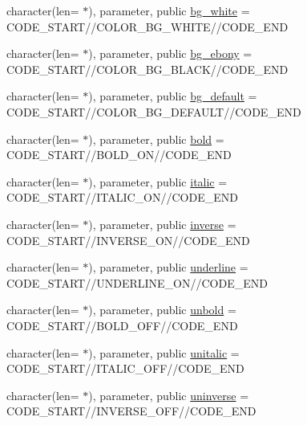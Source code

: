 \begin{DoxyCompactItemize}
\item 
character(len= $\ast$), parameter, public \mbox{\hyperlink{namespacem__escape_a87dfd88e3190a8717cc574d4f2a4445c}{bg\+\_\+white}} = C\+O\+D\+E\+\_\+\+S\+T\+A\+RT//C\+O\+L\+O\+R\+\_\+\+B\+G\+\_\+\+W\+H\+I\+TE//C\+O\+D\+E\+\_\+\+E\+ND
\item 
character(len= $\ast$), parameter, public \mbox{\hyperlink{namespacem__escape_ab3691cc02cfaf12d6f7e18fac8a70b0b}{bg\+\_\+ebony}} = C\+O\+D\+E\+\_\+\+S\+T\+A\+RT//C\+O\+L\+O\+R\+\_\+\+B\+G\+\_\+\+B\+L\+A\+CK//C\+O\+D\+E\+\_\+\+E\+ND
\item 
character(len= $\ast$), parameter, public \mbox{\hyperlink{namespacem__escape_a329b88dbfe4ad42f896cdf408dcd9784}{bg\+\_\+default}} = C\+O\+D\+E\+\_\+\+S\+T\+A\+RT//C\+O\+L\+O\+R\+\_\+\+B\+G\+\_\+\+D\+E\+F\+A\+U\+LT//C\+O\+D\+E\+\_\+\+E\+ND
\item 
character(len= $\ast$), parameter, public \mbox{\hyperlink{namespacem__escape_a9a369de1d051ce7fdbdedcba4574c962}{bold}} = C\+O\+D\+E\+\_\+\+S\+T\+A\+RT//B\+O\+L\+D\+\_\+\+ON//C\+O\+D\+E\+\_\+\+E\+ND
\item 
character(len= $\ast$), parameter, public \mbox{\hyperlink{namespacem__escape_afbb060c43fe019ca7fc699073cf30399}{italic}} = C\+O\+D\+E\+\_\+\+S\+T\+A\+RT//I\+T\+A\+L\+I\+C\+\_\+\+ON//C\+O\+D\+E\+\_\+\+E\+ND
\item 
character(len= $\ast$), parameter, public \mbox{\hyperlink{namespacem__escape_a568054a95202a9290fc4f314ff7c9012}{inverse}} = C\+O\+D\+E\+\_\+\+S\+T\+A\+RT//I\+N\+V\+E\+R\+S\+E\+\_\+\+ON//C\+O\+D\+E\+\_\+\+E\+ND
\item 
character(len= $\ast$), parameter, public \mbox{\hyperlink{namespacem__escape_acee3a3082a12ed884ef99019d0f30f86}{underline}} = C\+O\+D\+E\+\_\+\+S\+T\+A\+RT//U\+N\+D\+E\+R\+L\+I\+N\+E\+\_\+\+ON//C\+O\+D\+E\+\_\+\+E\+ND
\item 
character(len= $\ast$), parameter, public \mbox{\hyperlink{namespacem__escape_aaa2404c29a0f5840417e71a8219a118c}{unbold}} = C\+O\+D\+E\+\_\+\+S\+T\+A\+RT//B\+O\+L\+D\+\_\+\+O\+FF//C\+O\+D\+E\+\_\+\+E\+ND
\item 
character(len= $\ast$), parameter, public \mbox{\hyperlink{namespacem__escape_a6b95826bb2793069e7fa8f8386bdb520}{unitalic}} = C\+O\+D\+E\+\_\+\+S\+T\+A\+RT//I\+T\+A\+L\+I\+C\+\_\+\+O\+FF//C\+O\+D\+E\+\_\+\+E\+ND
\item 
character(len= $\ast$), parameter, public \mbox{\hyperlink{namespacem__escape_a067207898e3ef5118bc1cad83f40dad8}{uninverse}} = C\+O\+D\+E\+\_\+\+S\+T\+A\+RT//I\+N\+V\+E\+R\+S\+E\+\_\+\+O\+FF//C\+O\+D\+E\+\_\+\+E\+ND

\end{DoxyCompactItemize}
